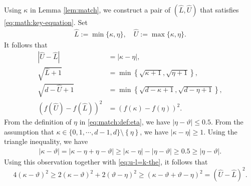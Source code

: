 \documentclass[onecolumn,letterpaper]{IEEEtran}
\newcommand{\plsize}{{\chi}}
\newcommand{\var}{{\sigma^{2}}}
\newcommand{\nan}{{\kappa}}
\newcommand{\apn}{{\gamma}}
\newcommand{\mnp}{{\vartheta}}
\newcommand{\arb}{{\eta}}
\newcommand{\lwm}{{\hat{L}}}
\newcommand{\upm}{{\hat{U}}}
\begin{document}
\begin{IEEEproof}
Using $\nan$ in Lemma \ref{lem:match}, we construct a pair of $(\lwm,\upm)$ that satisfies \eqref{eq:math:key-equation}. Set
\begin{align}
   \lwm:= \min\{ \nan,\arb \}, \quad  \upm := \max\{ \nan,\arb \}.
\end{align}
It follows that 
\begin{align}
|\upm-\lwm|&=\left|\nan-\arb\right|\label{eq:u-l=k-the} ,\\
\sqrt{\lwm+1}&=\min\left\{ \sqrt{\nan+1}, \sqrt{\arb+1} \right\}   ,\label{eq:l:min:kthe}\\
\sqrt{d-\upm+1}&=\min\left\{\sqrt{d-\nan+1}, \sqrt{d-\arb+1}\right\} , \label{eq:u:max:kthe}\\
\left(f(\upm)-f(\lwm)\right)^2&=\left(f(\nan)-f\left(\arb\right)\right)^2. \label{eq:fu-fl=fk-fo}
\end{align}
From the definition of $\arb$ in \eqref{eq:match:def:eta}, we have $|\arb-\mnp |\leq 0.5$. From the assumption that $\nan \in \{0,1,\cdots,d-1,d\} \setminus \left\{ \arb \right\}$, we have $|\nan-\arb | \geq 1$. Using the triangle inequality, we have 
\begin{align*}
|\nan-\mnp|=|\nan-\arb+\arb-\mnp|\geq |\nan-\arb|-|\arb-\mnp|\geq 0.5\geq |\arb-\mnp |.
\end{align*}
Using this observation together with \eqref{eq:u-l=k-the}, it follows that
\begin{equation}
\label{eq:k-theta:u-l}
    4(\nan - \mnp)^2 \ge 2(\nan - \mnp)^2 + 2(\mnp - \arb)^2 \ge (\nan -\mnp+\mnp- \arb)^2 = (\upm - \lwm)^2.
\end{equation}

\end{IEEEproof}
\end{document}
